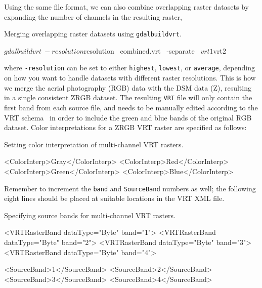 Using the same file format, we can also combine overlapping raster datasets by expanding the number of channels in the resulting raster,
\begin{listing}[H]
  \caption{Merging overlapping raster datasets using \texttt{gdalbuildvrt}.}
  \begin{shellcode}
  $ gdalbuildvrt \
    -resolution ${resolution} \
    combined.vrt \
    -separate \
    ${vrt1} ${vrt2} 
  \end{shellcode}
\end{listing}
\noindent
where \texttt{-resolution} can be set to either \texttt{highest}, \texttt{lowest}, or \texttt{average}, depending on how you want to handle datasets with different raster resolutions.
This is how we merge the aerial photography (RGB) data with the DSM data (Z), resulting in a single consistent ZRGB dataset.
The resulting \texttt{VRT} file will only contain the first band from each source file, and needs to be manually edited according to the VRT schema~\cite{vrt_schema_2015} in order to include the green and blue bands of the original RGB dataset.
Color interpretations for a ZRGB VRT raster are specified as follows:
%
\begin{listing}[H]
  \caption{Setting color interpretation of multi-channel VRT rasters.}
  \begin{xmlcode}
  <ColorInterp>Gray</ColorInterp>
  <ColorInterp>Red</ColorInterp>
  <ColorInterp>Green</ColorInterp>
  <ColorInterp>Blue</ColorInterp>
  \end{xmlcode}
\end{listing}
\noindent
Remember to increment the \texttt{band} and \texttt{SourceBand} numbers as well; the following eight lines should be placed at suitable locations in the VRT XML file.

\begin{listing}[H]
  \caption{Specifying source bands for multi-channel VRT rasters.}
  \begin{xmlcode}
  <VRTRasterBand dataType="Byte" band="1">
  <VRTRasterBand dataType="Byte" band="2">
  <VRTRasterBand dataType="Byte" band="3">
  <VRTRasterBand dataType="Byte" band="4">

  <SourceBand>1</SourceBand>
  <SourceBand>2</SourceBand>
  <SourceBand>3</SourceBand>
  <SourceBand>4</SourceBand>
  \end{xmlcode}
\end{listing}
